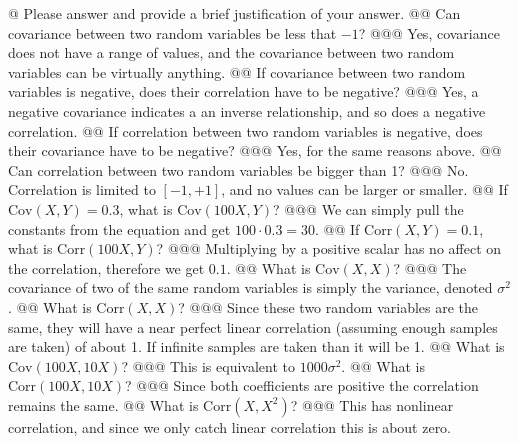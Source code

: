 \documentclass[10pt]{article}
\begin{document}
\begin{easylist}[enumerate]
    @ Please answer and provide a brief justification of your answer.
    @@ Can covariance between two random variables be less that $-1$?
    @@@ Yes, covariance does not have a range of values, and the covariance between two random variables can be
    virtually anything.
    @@ If covariance between two random variables is negative, does their correlation have to be negative?
    @@@ Yes, a negative covariance indicates a an inverse relationship, and so does a negative correlation.
    @@ If correlation between two random variables is negative, does their covariance have to be negative?
    @@@ Yes, for the same reasons above.
    @@ Can correlation between two random variables be bigger than 1?
    @@@ No. Correlation is limited to $[-1,+1]$, and no values can be larger or smaller.
    @@ If $\text{Cov}(X,Y) = 0.3$, what is $\text{Cov}(100X, Y)$?
    @@@ We can simply pull the constants from the equation and get $\boxed{100 \cdot 0.3 = 30}$.
    @@ If $\text{Corr}(X,Y) = 0.1$, what is $\text{Corr}(100X, Y)$?
    @@@ Multiplying by a positive scalar has no affect on the correlation, therefore we get $\boxed{0.1}$.
    @@ What is $\text{Cov}(X,X)$?
    @@@ The covariance of two of the same random variables is simply the variance, denoted $\sigma^2$.
    @@ What is $\text{Corr}(X,X)$?
    @@@ Since these two random variables are the same, they will have a near perfect linear correlation (assuming enough
    samples are taken) of about 1. If infinite samples are taken than it will be 1.
    @@ What is $\text{Cov}(100X,10X)$?
    @@@ This is equivalent to $1000\sigma^2$.
    @@ What is $\text{Corr}(100X,10X)$?
    @@@ Since both coefficients are positive the correlation remains the same.
    @@ What is $\text{Corr}(X,X^2)$?
    @@@ This has nonlinear correlation, and since we only catch linear correlation this is about zero.


\end{easylist}
\end{document}
